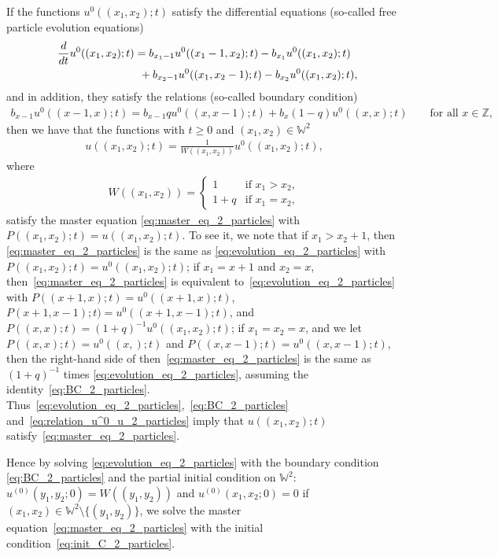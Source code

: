 \documentclass[11pt]{article}
\numberwithin{equation}{section}
\newcommand{\intZ}{\mathbb{Z}}
\newcommand{\Weylchamber}{\mathbb{W}}
\begin{document}
If the functions $u^0((x_1, x_2); t)$ satisfy the dif\/ferential equations (so-called free particle evolution equations)
\begin{gather}
 \frac{d}{dt} u^0((x_1, x_2); t) = b_{x_1 - 1} u^0((x_1 - 1, x_2); t) - b_{x_1} u^0((x_1, x_2); t) \nonumber\\
 \hphantom{\frac{d}{dt} u^0((x_1, x_2); t) =}{} + b_{x_2 - 1} u^0((x_1, x_2 - 1); t) - b_{x_2} u^0((x_1, x_2); t),\label{eq:evolution_eq_2_particles}
\end{gather}
and in addition, they satisfy the relations (so-called boundary condition)
\begin{gather} \label{eq:BC_2_particles}
 b_{x - 1} u^0((x - 1, x); t) = b_{x - 1} q u^0((x, x - 1); t) + b_x (1 - q) u^0((x, x); t) \qquad \text{for all $x \in \intZ$},\!\!\!
\end{gather}
then we have that the functions with $t \geq 0$ and $(x_1, x_2) \in \Weylchamber^2$
\begin{gather} \label{eq:relation_u^0_u_2_particles}
 u((x_1, x_2); t) = \frac{1}{W((x_1, x_2))} u^0((x_1, x_2); t),
 \end{gather}
where
\begin{gather*}
W((x_1, x_2)) =
 \begin{cases}
 1 & \text{if $x_1 > x_2$}, \\
 1 + q & \text{if $x_1 = x_2$},
 \end{cases}
\end{gather*}
satisfy the master equation \eqref{eq:master_eq_2_particles} with $P((x_1, x_2); t) = u((x_1, x_2); t)$. To see it, we note that if $x_1 > x_2 + 1$, then \eqref{eq:master_eq_2_particles} is the same as \eqref{eq:evolution_eq_2_particles} with $P((x_1, x_2); t) = u^0((x_1, x_2); t)$; if $x_1 = x + 1$ and $x_2 = x$, then~\eqref{eq:master_eq_2_particles} is equivalent to~\eqref{eq:evolution_eq_2_particles} with $P((x + 1, x); t) = u^0((x + 1, x); t)$, $P(x + 1, x - 1); t) = u^0((x + 1, x - 1); t)$, and $P((x, x); t) = (1 + q)^{-1} u^0((x_1, x_2); t)$; if $x_1 = x_2 = x$, and we let $P((x, x); t) = u^0((x, ); t)$ and $P((x, x - 1); t) = u^0((x, x - 1); t)$, then the right-hand side of then~\eqref{eq:master_eq_2_particles} is the same as $(1 + q)^{-1}$ times \eqref{eq:evolution_eq_2_particles}, assuming the identity~\eqref{eq:BC_2_particles}. Thus~\eqref{eq:evolution_eq_2_particles},~\eqref{eq:BC_2_particles} and~\eqref{eq:relation_u^0_u_2_particles} imply that $u((x_1, x_2); t)$ satisfy~\eqref{eq:master_eq_2_particles}.

Hence by solving \eqref{eq:evolution_eq_2_particles} with the boundary condition \eqref{eq:BC_2_particles} and the partial initial condition on $\Weylchamber^2$: $u^{(0)}(y_1, y_2; 0) = W((y_1, y_2))$ and $u^{(0)}(x_1, x_2; 0) = 0$ if $(x_1, x_2) \in \Weylchamber^2 {\setminus} \{ (y_1, y_2) \}$, we solve the master equation~\eqref{eq:master_eq_2_particles} with the initial condition~\eqref{eq:init_C_2_particles}.
\end{document}
